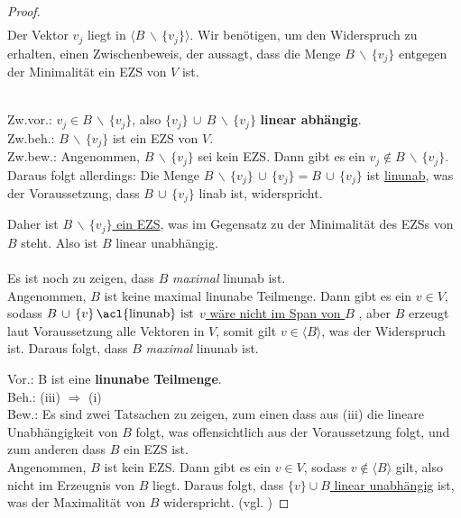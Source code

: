 \begin{proof}
\begin{align*}
\end{align*}
Der Vektor $v_j$ liegt in $\langle B \, \backslash \, \{v_j\} \rangle$. Wir benötigen, um den Widerspruch zu erhalten, einen Zwischenbeweis, der aussagt, dass die Menge $B \, \backslash \, \{v_j\}$ entgegen der Minimalität ein \acl{EZS} von $V$ ist.
\par
\begingroup
\leftskip=2cm
\noindent
\\Zw.vor.: $v_j \in B \, \backslash \, \{v_j\}$, also $ \{v_j\}\, \cup\, B \, \backslash \, \{v_j\}$ \textbf{linear abhängig}. 
\\Zw.beh.: $B \, \backslash \, \{v_j\}$ ist ein \acl{EZS} von $V$.
\\Zw.bew.: Angenommen, $B \, \backslash \, \{v_j\}$ sei kein \acl{EZS}. Dann gibt es ein $v_j \notin B \, \backslash \, \{v_j\}$. Daraus folgt allerdings: Die Menge $B \, \backslash \, \{v_j\} \,\cup\, \{v_j\} = B\, \cup\, \{v_j\} $ ist \underline{\acl{linunab}}, was der Voraussetzung, dass $B \,\cup\, \{v_j\}$ \acl{linab} ist, widerspricht.
\\
\par
\endgroup
\noindent Daher ist \underline{$B \, \backslash \, \{v_j\}$ ein \acl{EZS}}, was im Gegensatz zu der Minimalität des \acl{EZS}s von $B$ steht. Also ist $B$ linear unabhängig.
\\ \\ \indent Es ist noch zu zeigen, dass $B$ \emph{maximal} \acl{linunab} ist. 
\\Angenommen, $B$ ist keine maximal \acl{linunab}e Teilmenge.
Dann gibt es ein $v \in V$, sodass \( B \,\cup\, \{v\}\,\text{\acl{linunab} ist}\) {\textendash} \underline{$v$ wäre nicht im Span von $B$} {\textendash}, aber $B$ erzeugt laut Voraussetzung alle Vektoren in $V$, somit gilt $v \in \langle B \rangle$, was der Widerspruch ist. Daraus folgt, dass $B$ \emph{maximal} \acl{linunab} ist. 

\newpage
\noindent Vor.: B ist eine \textbf{ \acl{linunab}e Teilmenge}.
\\ Beh.: (iii) $\Rightarrow$ (i) 
\\ Bew.: Es sind zwei Tatsachen zu zeigen, zum einen dass aus (iii) die lineare Unabhängigkeit von $B$ folgt, was offensichtlich aus der Voraussetzung folgt, und zum anderen dass $B$ ein \acl{EZS} ist. 
\\ Angenommen, $B$ ist kein \acl{EZS}. Dann gibt es ein $v \in V$, sodass $v \notin \langle B \rangle$ gilt, also nicht im Erzeugnis von $B$ liegt. Daraus folgt, dass \underline{$\{v\} \cup B$ linear unabhängig} ist, was der Maximalität von $B$ widerspricht. (vgl. \cite[S. 59]{Beutel}) 
\end{proof}

